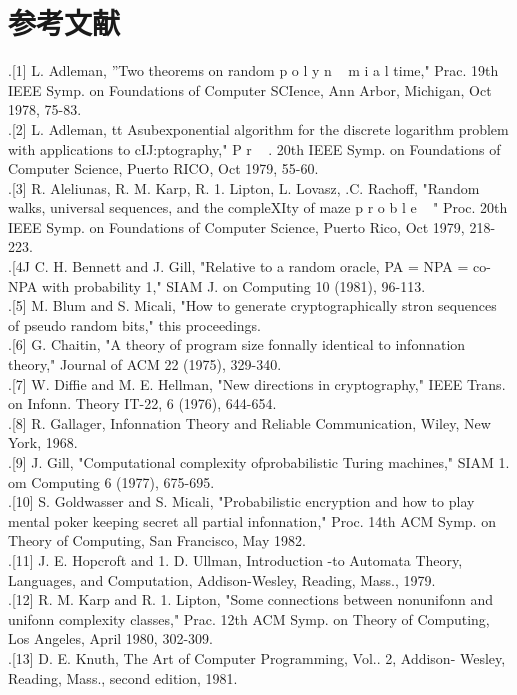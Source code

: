 \documentclass[]{article}
\begin{document}
\section*{参考文献}
.[1] L. Adleman, ''Two theorems on random p o l y n ~ m i a l time," Prac.
19th IEEE Symp. on Foundations of Computer SCIence, Ann Arbor,
Michigan, Oct 1978, 75-83.\\
.[2] L. Adleman, tt Asubexponential algorithm for the discrete logarithm
problem with applications to cIJ:ptography," P r ~ . 20th IEEE Symp.
on Foundations of Computer Science, Puerto RICO, Oct 1979, 55-60.\\
.[3] R. Aleliunas, R. M. Karp, R. 1. Lipton, L. Lovasz, .C. Rachoff,
"Random walks, universal sequences, and the compleXIty of maze
p r o b l e ~ " Proc. 20th IEEE Symp. on Foundations of Computer
Science, Puerto Rico, Oct 1979, 218-223.\\
.[4J C. H. Bennett and J. Gill, "Relative to a random oracle, PA = NPA
= co-NPA with probability 1," SIAM J. on Computing 10 (1981),
96-113.\\
.[5] M. Blum and S. Micali, "How to generate cryptographically stron
sequences of pseudo random bits," this proceedings.\\
.[6] G. Chaitin, "A theory of program size fonnally identical to
infonnation theory," Journal of ACM 22 (1975), 329-340.\\
.[7] W. Diffie and M. E. Hellman, "New directions in cryptography,"
IEEE Trans. on Infonn. Theory IT-22, 6 (1976), 644-654.\\
.[8] R. Gallager, Infonnation Theory and Reliable Communication,
Wiley, New York, 1968.\\
.[9] J. Gill, "Computational complexity ofprobabilistic Turing machines,"
SIAM 1. om Computing 6 (1977), 675-695.\\
.[10] S. Goldwasser and S. Micali, "Probabilistic encryption and how to
play mental poker keeping secret all partial infonnation," Proc. 14th
ACM Symp. on Theory of Computing, San Francisco, May 1982.\\
.[11] J. E. Hopcroft and 1. D. Ullman, Introduction -to Automata Theory,
Languages, and Computation, Addison-Wesley, Reading, Mass., 1979.\\
.[12] R. M. Karp and R. 1. Lipton, "Some connections between
nonunifonn and unifonn complexity classes," Prac. 12th ACM Symp.
on Theory of Computing, Los Angeles, April 1980, 302-309.\\
.[13] D. E. Knuth, The Art of Computer Programming, Vol.. 2,
Addison- Wesley, Reading, Mass., second edition, 1981.\\
\end{document}
